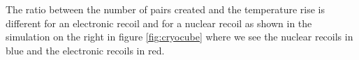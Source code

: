 The ratio between the number of pairs created and the temperature rise is different for an electronic recoil and for a nuclear recoil as shown in the simulation on the right in figure \ref{fig:cryocube} where we see the nuclear recoils in blue and the electronic recoils in red.






%
%
%
%


%
%
%
